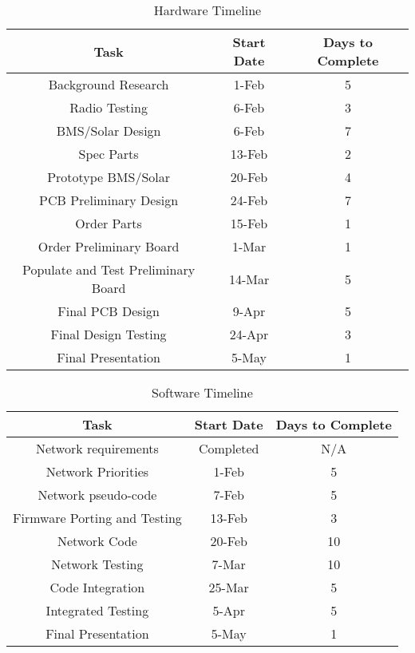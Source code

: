 \documentclass[12pt]{article}
\begin{document}

\begin{table}[H]
\centering
\caption{Hardware Timeline}
\begin{tabular}{ |c|c|c|}
\hline
 \bf Task & \bf Start Date & \bf Days to Complete\\ 
 \hline
Background Research 	& 1-Feb	& 5 \\
Radio Testing	& 6-Feb	& 3 \\
BMS/Solar Design	 & 6-Feb	& 7 \\
Spec Parts	& 13-Feb	 & 2 \\
Prototype BMS/Solar	& 20-Feb	 & 4 \\
PCB Preliminary Design 	& 24-Feb &	7 \\
Order Parts	& 15-Feb	 & 1 \\
Order Preliminary Board  &	1-Mar	 & 1 \\
Populate and Test Preliminary Board 	& 14-Mar & 	5 \\
Final PCB Design	& 9-Apr & 	5 \\
Final Design Testing	 & 24-Apr &	3 \\
Final Presentation & 5-May & 1 \\
\hline
\end{tabular}
\end{table}


\begin{table}[H]
\centering
\caption{Software Timeline}
\begin{tabular}{ |c|c|c|}
\hline
 \bf Task & \bf Start Date & \bf Days to Complete\\ 
 \hline
Network requirements 	& Completed	& N/A \\
Network Priorities 	& 1-Feb &	5 \\
Network pseudo-code	 & 7-Feb	& 5 \\
Firmware Porting and Testing	& 13-Feb	& 3 \\
Network Code	& 20-Feb & 	10 \\
Network Testing	 & 7-Mar &	10 \\
Code Integration	& 25-Mar	 & 5 \\
Integrated Testing	& 5-Apr	 & 5 \\
Final Presentation & 5-May & 1 \\
\hline
\end{tabular}
\end{table}
\end{document}
